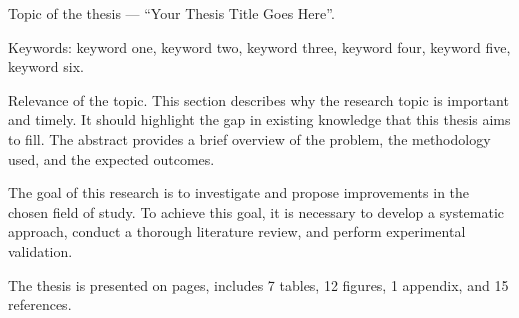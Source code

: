 
Topic of the thesis --- ``Your Thesis Title Goes Here''.

Keywords: keyword one, keyword two, keyword three, keyword four, keyword five, keyword six.

Relevance of the topic.
This section describes why the research topic is important and timely.
It should highlight the gap in existing knowledge that this thesis aims to fill.
The abstract provides a brief overview of the problem, the methodology used, and the expected outcomes.

The goal of this research is to investigate and propose improvements in the chosen field of study.
To achieve this goal, it is necessary to develop a systematic approach, conduct a thorough literature review, and perform experimental validation.

The thesis is presented on \pageref{LastPage} pages, includes 7 tables, 12 figures, 1 appendix, and 15 references.

\clearpage
